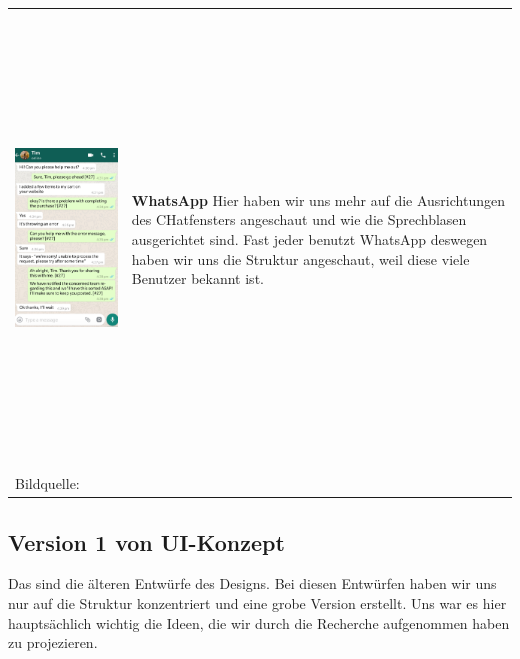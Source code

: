 \begin{tabular}{C{6cm}  L{7cm}}
    \includegraphics[width=\linewidth, height=12cm]{bilder/research pic/Tim Whatsapp.png} & \textbf{WhatsApp} \newline
    Hier haben wir uns mehr auf die Ausrichtungen des CHatfensters angeschaut und wie die Sprechblasen
    ausgerichtet sind. Fast jeder benutzt WhatsApp deswegen haben wir uns die Struktur angeschaut,
    weil diese viele Benutzer bekannt ist.                                                                              \\
    Bildquelle:\cite{timwhatsApp} \newline
\end{tabular}

\newpage

\subsection{Version 1 von UI-Konzept}

Das sind die älteren Entwürfe des Designs. Bei diesen Entwürfen haben wir uns nur auf die Struktur
konzentriert und eine grobe Version erstellt. Uns war es hier hauptsächlich wichtig
die Ideen, die wir durch die Recherche aufgenommen haben zu projezieren.
\\

